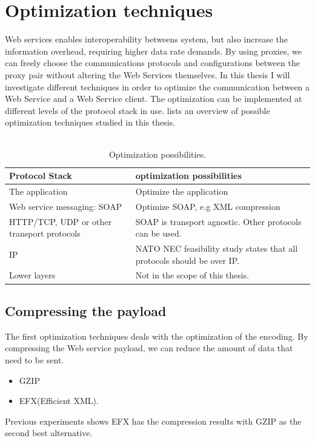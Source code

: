 \documentclass[USenglish]{ifimaster}
\begin{document}
\section{Optimization techniques}
Web services enables interoperability betweens system, but also increase the
information overhead, requiring higher data rate demands. By using proxies, we
can freely choose the communications protocols and configurations between the
proxy pair without altering the Web Services themselves. In this thesis I will
investigate different techniques in order to optimize the communication between
a Web Service and a Web Service client. The optimization can be implemented at
different levels of the protocol stack in use.
 lists an overview of possible optimization
techniques studied in this thesis. \\ \\

\begin{table}[h]
\begin{tabularx}{\textwidth}{| X | X |}
\hline
  \textbf{Protocol Stack} & \textbf{optimization possibilities} \\ \hline
  The application & Optimize the application\\ \hline
  Web service messaging: SOAP & Optimize SOAP, e.g XML compression \\ \hline
  HTTP/TCP, UDP or other transport protocols & SOAP is transport agnostic. Other
  protocols can be used. \\ \hline
  IP & NATO NEC feasibility study states that all protocols should be over IP. \\
  \hline
  Lower layers & Not in the scope of this thesis. \\ \hline
\end{tabularx}
\caption{Optimization possibilities.} \label{table:optimalization-overview}
\end{table}


\subsection{Compressing the payload}
The first optimization techniques deals with the optimization of the encoding. By compressing the Web service payload, we can reduce the amount of data that need to be sent.
\begin{itemize}
\item GZIP
\item EFX(Efficient XML).
\end{itemize}
Previous experiments shows EFX has the compression results with GZIP as the second best alternative\cite{johnsen-trude-compression-techniqes}.
\end{document}
